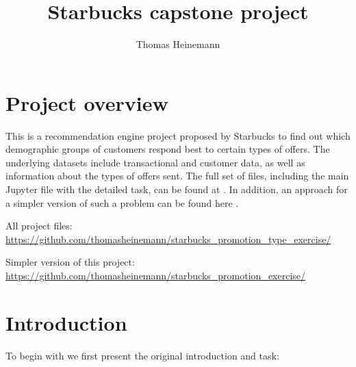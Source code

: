 \documentclass[11pt]{article} %
\title{Starbucks capstone project}
\author{Thomas Heinemann}
\begin{document}
\maketitle

\section{Project overview}

This is a recommendation engine project proposed by Starbucks to find out which demographic groups of customers respond best to certain types of offers. The underlying datasets include transactional and customer data, as well as information about the types of offers sent. The full set
of files, including the main Jupyter file with the detailed task, can be found at \cite{a}.
In addition, an approach for a simpler version of such a problem can be found here \cite{b}.


\begin{thebibliography}{2}

 All project files: {\scriptsize \url{https://github.com/thomasheinemann/starbucks_promotion_type_exercise/}}

 Simpler version of this project: {\scriptsize\url{https://github.com/thomasheinemann/starbucks_promotion_exercise/}}



\end{thebibliography}

\section{Introduction}
To begin with we first present the original introduction and task:
\end{document}

